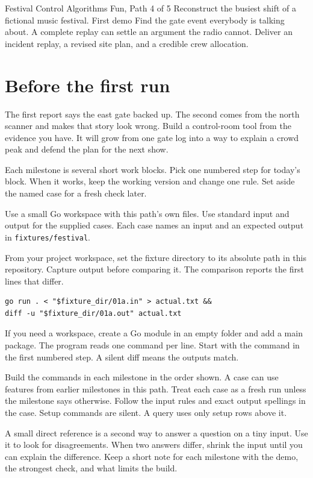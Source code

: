 \documentclass[11pt,letterpaper]{article}
\begin{document}
\coursecover
  {Festival Control}
  {Algorithms Fun, Path 4 of 5}
  {Reconstruct the busiest shift of a fictional music festival.}
  {First demo}
  {Find the gate event everybody is talking about.}
  {A complete replay can settle an argument the radio cannot.}
  {Deliver an incident replay, a revised site plan, and a credible crew allocation.}
\tableofcontents
\clearpage
\section{Before the first run}
The first report says the east gate backed up. The second comes from the north scanner and makes that story look wrong. Build a control-room tool from the evidence you have. It will grow from one gate log into a way to explain a crowd peak and defend the plan for the next show.

Each milestone is several short work blocks. Pick one numbered step for today's block. When it works, keep the working version and change one rule. Set aside the named case for a fresh check later.

Use a small Go workspace with this path's own files. Use standard input and output for the supplied cases. Each case names an input and an expected output in \texttt{fixtures/festival}.

From your project workspace, set the fixture directory to its absolute path in this repository. Capture output before comparing it. The comparison reports the first lines that differ.
\begin{samepage}
\small
\begin{verbatim}
go run . < "$fixture_dir/01a.in" > actual.txt &&
diff -u "$fixture_dir/01a.out" actual.txt
\end{verbatim}
\end{samepage}

If you need a workspace, create a Go module in an empty folder and add a main package. The program reads one command per line. Start with the command in the first numbered step. A silent diff means the outputs match.

Build the commands in each milestone in the order shown. A case can use features from earlier milestones in this path. Treat each case as a fresh run unless the milestone says otherwise. Follow the input rules and exact output spellings in the case. Setup commands are silent. A query uses only setup rows above it.

A small direct reference is a second way to answer a question on a tiny input. Use it to look for disagreements. When two answers differ, shrink the input until you can explain the difference. Keep a short note for each milestone with the demo, the strongest check, and what limits the build.
\end{document}
